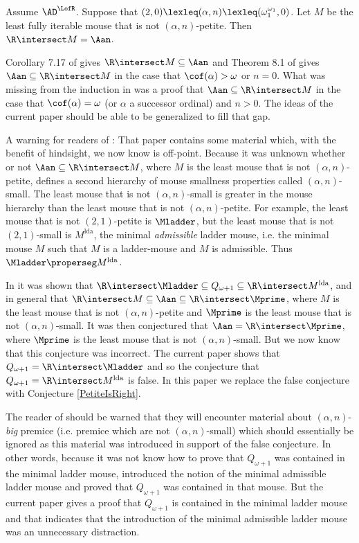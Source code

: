 \documentclass[oneside,12pt]{amsart}
\begin{document}
\begin{conjecture}
\label{PetiteIsRight}
Assume $\AD^{\LofR}$. Suppose that
$(2,0) \lexleq (\alpha,n) \lexleq (\omega_1^{\omega_1}, 0)$.
Let $M$ be the least fully iterable mouse that is not $(\alpha, n)$-petite.
Then $\R\intersect M = \Aan$.
\end{conjecture}

Corollary 7.17 of \cite{Mouse_Sets} gives $\R\intersect M \subseteq \Aan$
and Theorem 8.1 of \cite{Mouse_Sets} gives $\Aan \subseteq \R\intersect M$
in the case that $\cof(\alpha)>\omega$ or $n=0$. What was missing from the
induction in \cite{Mouse_Sets} was a proof that $\Aan\subseteq \R \intersect M$
in the case that $\cof(\alpha)=\omega$ (or $\alpha$ a successor ordinal) and $n>0$.
The ideas of the current paper
should be able to be generalized to fill that gap.

A warning for readers of \cite{Mouse_Sets}: That paper contains some material which, with the benefit of hindsight,
we now know is off-point. Because it was unknown whether or not
$\Aan\subseteq \R\intersect M$, where $M$ is the least mouse that is not
$(\alpha,n)$-petite, \cite{Mouse_Sets} defines a second hierarchy of mouse
smallness properties called $(\alpha,n)$-small. The least mouse that is not
$(\alpha,n)$-small is greater in the mouse hierarchy than the least mouse that
is not $(\alpha,n)$-petite. For example, the least mouse that is not
$(2,1)$-petite is $\Mladder$, but the least mouse that is not
$(2,1)$-small is $M^{\text{lda}}$, the minimal \emph{admissible} ladder mouse,
i.e. the minimal mouse $M$ such that $M$ is a ladder-mouse and
$M$ is admissible. Thus $\Mladder\properseg M^{\text{lda}}$.

In
\cite{Mouse_Sets} it was shown that
$\R\intersect \Mladder \subseteq Q_{\omega+1}\subseteq \R\intersect M^{\text{lda}}$, and in general that $\R \intersect M \subseteq \Aan\subseteq \R\intersect\Mprime$, where $M$ is the least mouse that is not
$(\alpha,n)$-petite and $\Mprime$ is the least mouse that is not
$(\alpha,n)$-small. It was then conjectured that
$\Aan=\R\intersect \Mprime$, where $\Mprime$ is the least mouse that is not
$(\alpha,n)$-small. But we now know that this conjecture was incorrect. The
current
paper shows that $Q_{\omega+1}=\R\intersect\Mladder$ and so the conjecture
that $Q_{\omega+1}=\R\intersect M^{\text{lda}}$ is false. In this paper we
replace the false conjecture with Conjecture \ref{PetiteIsRight}.

The reader of \cite{Mouse_Sets} should be warned that they will encounter
material about $(\alpha,n)$-\emph{big} premice
(i.e. premice which are not $(\alpha,n)$-small) which should essentially
be ignored as this material was introduced in support of the false conjecture.
In other words, because it was not know how to prove that $Q_{\omega+1}$
was contained in the minimal ladder mouse, \cite{Mouse_Sets} introduced the
notion of the minimal admissible ladder mouse and proved that
$Q_{\omega+1}$ was contained in that mouse. But the current paper gives a
proof that $Q_{\omega+1}$ is contained in the minimal ladder mouse and
that indicates
that the introduction of the minimal admissible ladder mouse was an
unnecessary distraction.
\end{document}
